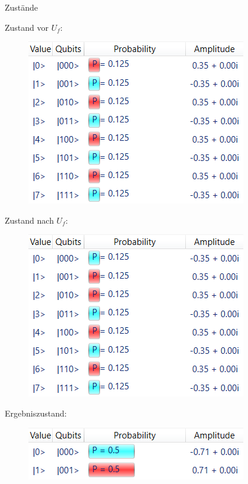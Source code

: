 \documentclass[fleqn,compress,utf8,aspectratio=169,t]{beamer}
\begin{document}
\begin{frame}{Zustände}
\begin{minipage}[t]{.333\textwidth}
\centering
Zustand vor $U_f$:
\begin{figure}
	\includegraphics[width=.9\textwidth]{images/2d-vor-UF.png}
\end{figure}
\end{minipage}%
\begin{minipage}[t]{.333\textwidth}
\centering
Zustand nach $U_f$:
\begin{figure}
	\includegraphics[width=.9\textwidth]{images/2d-nach-UF.png}
\end{figure}
\end{minipage}%
\begin{minipage}[t]{.333\textwidth}
\centering
Ergebniszustand:
\begin{figure}
	\includegraphics[width=.9\textwidth]{images/2d-nach-D2.png}
\end{figure}
\end{minipage}%
\end{frame}
\end{document}
